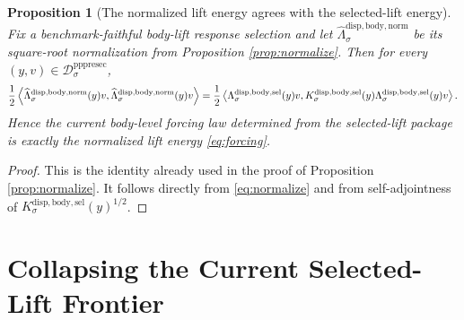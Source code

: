 \documentclass[11pt]{article}
\newcommand{\PrePreProtoSectionResidualBody}[1]{\mathcal D_{#1}^{\mathrm{pppresec}}}
\newcommand{\SelectedResponseLift}[1]{\Lambda_{#1}^{\mathrm{disp,body,sel}}}
\newcommand{\SelectedResponseOperator}[1]{K_{#1}^{\mathrm{disp,body,sel}}}
\newcommand{\NormalizedSelectedResponseLift}[1]{\widehat{\Lambda}_{#1}^{\mathrm{disp,body,norm}}}
\newtheorem{proposition}{Proposition}
\begin{document}
\begin{proposition}[The normalized lift energy agrees with the selected-lift energy]
\label{prop:energy}
Fix a benchmark-faithful body-lift response selection and let \(\NormalizedSelectedResponseLift{\sigma}\) be its square-root normalization from Proposition \ref{prop:normalize}. Then for every \((y,v)\in\PrePreProtoSectionResidualBody{\sigma}\),
\[
\frac{1}{2}
\ev{
\NormalizedSelectedResponseLift{\sigma}(y)v,
\NormalizedSelectedResponseLift{\sigma}(y)v
}
=
\frac{1}{2}
\ev{
\SelectedResponseLift{\sigma}(y)v,
\SelectedResponseOperator{\sigma}(y)\SelectedResponseLift{\sigma}(y)v
}.
\]
Hence the current body-level forcing law determined from the selected-lift package is exactly the normalized lift energy \eqref{eq:forcing}.
\end{proposition}

\begin{proof}
This is the identity already used in the proof of Proposition \ref{prop:normalize}. It follows directly from \eqref{eq:normalize} and from self-adjointness of \(\SelectedResponseOperator{\sigma}(y)^{1/2}\).
\end{proof}

\section{Collapsing the Current Selected-Lift Frontier}
\end{document}
